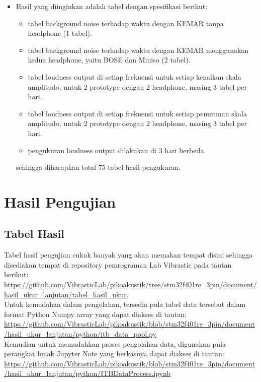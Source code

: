 \documentclass[12pt,]{article}
\begin{document}
\begin{itemize}
		\item Hasil yang diinginkan adalah tabel dengan spesifikasi berikut:
		\begin{itemize}
			\item tabel background noise terhadap waktu dengan KEMAR tanpa headphone (1 tabel).
			\item tabel background noise terhadap waktu dengan KEMAR menggunakan kedua headphone, yaitu BOSE dan Miniso (2 tabel).
			\item tabel loudness output di setiap frekuensi untuk setiap kenaikan skala amplitudo, untuk 2 prototype dengan 2 headphone, masing 3 tabel per hari.
			\item tabel loudness output di setiap frekuensi untuk setiap penurunan skala amplitudo, untuk 2 prototype dengan 2 headphone, masing 3 tabel per hari.
			\item pengukuran loudness output dilakukan di 3 hari berbeda.
		\end{itemize}

		sehingga diharapkan total 75 tabel hasil pengukuran.
	\end{itemize}

	\newpage
	\section{Hasil Pengujian}

	\subsection{Tabel Hasil}

	Tabel hasil pengujian cukuk banyak yang akan memakan tempat disini sehingga disediakan tempat di repository pemrograman Lab Vibrastic pada tautan berikut:\\
	\url{https://github.com/VibrasticLab/pikoakustik/tree/stm32f401re_3pin/document/hasil_ukur_lanjutan/tabel_hasil_ukur}.\\

	Untuk kemudahan dalam pengolahan, tersedia pula tabel data tersebut dalam format Python Numpy array yang dapat diakses di tautan:\\
	\url{https://github.com/VibrasticLab/pikoakustik/blob/stm32f401re_3pin/document/hasil_ukur_lanjutan/python/itb_data_pool.py}\\

	Kemudian untuk memudahkan proses pengolahan data, digunakan pula perangkat lunak Jupyter Note yang berkasnya dapat diakses di tautan:\\
	\url{https://github.com/VibrasticLab/pikoakustik/blob/stm32f401re_3pin/document/hasil_ukur_lanjutan/python/ITBDataProcess.ipynb}\\
\end{document}
